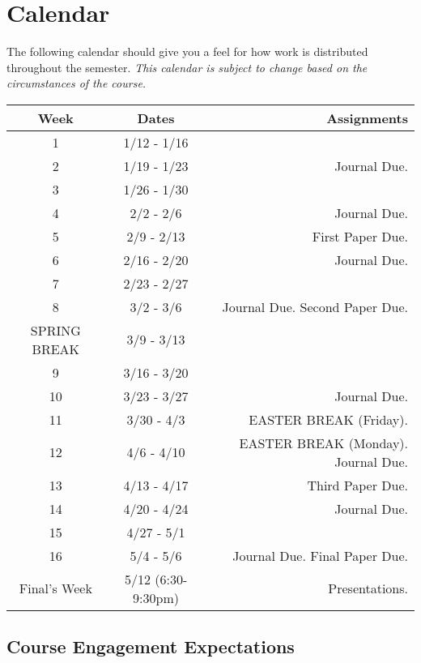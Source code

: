 \documentclass[]{tufte-handout}
\begin{document}
\section{Calendar}

The following calendar should give you a feel for how work is distributed throughout the semester.  \textit{This calendar is subject to change based on the circumstances of the course.}

\begin{center}
\begin{tabular}{|c|c|r|}
\hline 
Week & Dates & Assignments \\
\hline
1 & 1/12 - 1/16 &  \\
\hline
2 & 1/19 - 1/23 & Journal Due. \\
\hline
3 & 1/26 - 1/30 &   \\
\hline
4 & 2/2 - 2/6 & Journal Due.  \\
\hline
5 & 2/9 - 2/13 &  First Paper Due.\\
\hline
6 & 2/16 - 2/20 & Journal Due. \\
\hline
7 & 2/23 - 2/27 &   \\
\hline
8 & 3/2 - 3/6 & Journal Due. Second Paper Due.  \\
\hline 
SPRING BREAK & 3/9 - 3/13 &  \\
\hline
9 & 3/16 - 3/20 &  \\
\hline
10 & 3/23 - 3/27 & Journal Due. \\
\hline
11 & 3/30 - 4/3 &  EASTER BREAK (Friday).\\
\hline
12 & 4/6 - 4/10 & EASTER BREAK (Monday). Journal Due. \\
\hline
13 & 4/13 - 4/17 &   Third Paper Due.\\
\hline
14 & 4/20 - 4/24 &  Journal Due. \\
\hline
15 & 4/27 - 5/1 &  \\ 
\hline
16 & 5/4 - 5/6 & Journal Due. Final Paper Due.\\
\hline
Final's Week & 5/12 (6:30-9:30pm) & Presentations. \\ 
\hline
\end{tabular}
\end{center}

\subsection{Course Engagement Expectations}
\end{document}
